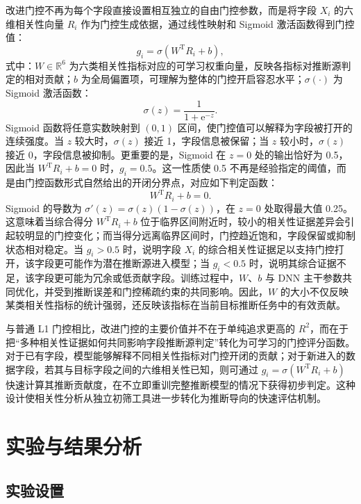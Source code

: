 \documentclass[UTF8,zihao=5,twoside]{ctexart}
\numberwithin{equation}{section}
\begin{document}
改进门控不再为每个字段直接设置相互独立的自由门控参数，而是将字段 $X_i$ 的六维相关性向量 $R_i$ 作为门控生成依据，通过线性映射和 Sigmoid 激活函数得到门控值：
\begin{equation}
g_i=\sigma(W^{\mathrm{T}}R_i+b),
\end{equation}
式中：$W\in\mathbb{R}^{6}$ 为六类相关性指标对应的可学习权重向量，反映各指标对推断源判定的相对贡献；$b$ 为全局偏置项，可理解为整体的门控开启容忍水平；$\sigma(\cdot)$ 为 Sigmoid 激活函数：
\begin{equation}
\sigma(z)=\frac{1}{1+\mathrm{e}^{-z}}.
\end{equation}
Sigmoid 函数将任意实数映射到 $(0,1)$ 区间，使门控值可以解释为字段被打开的连续强度。当 $z$ 较大时，$\sigma(z)$ 接近 1，字段信息被保留；当 $z$ 较小时，$\sigma(z)$ 接近 0，字段信息被抑制。更重要的是，Sigmoid 在 $z=0$ 处的输出恰好为 0.5，因此当 $W^{\mathrm{T}}R_i+b=0$ 时，$g_i=0.5$。这一性质使 0.5 不再是经验指定的阈值，而是由门控函数形式自然给出的开闭分界点，对应如下判定函数：
\begin{equation}
W^{\mathrm{T}}R_i+b=0.
\end{equation}
Sigmoid 的导数为 $\sigma'(z)=\sigma(z)(1-\sigma(z))$，在 $z=0$ 处取得最大值 0.25。这意味着当综合得分 $W^{\mathrm{T}}R_i+b$ 位于临界区间附近时，较小的相关性证据差异会引起较明显的门控变化；而当得分远离临界区间时，门控趋近饱和，字段保留或抑制状态相对稳定。当 $g_i>0.5$ 时，说明字段 $X_i$ 的综合相关性证据足以支持门控打开，该字段更可能作为潜在推断源进入模型；当 $g_i<0.5$ 时，说明其综合证据不足，该字段更可能为冗余或低贡献字段。训练过程中，$W$、$b$ 与 DNN 主干参数共同优化，并受到推断误差和门控稀疏约束的共同影响。因此，$W$ 的大小不仅反映某类相关性指标的统计强弱，还反映该指标在当前目标推断任务中的有效贡献。

与普通 L1 门控相比，改进门控的主要价值并不在于单纯追求更高的 $R^2$，而在于把“多种相关性证据如何共同影响字段推断源判定”转化为可学习的门控评分函数。对于已有字段，模型能够解释不同相关性指标对门控开闭的贡献；对于新进入的数据字段，若其与目标字段之间的六维相关性已知，则可通过 $g_i=\sigma(W^{\mathrm{T}}R_i+b)$ 快速计算其推断贡献度，在不立即重训完整推断模型的情况下获得初步判定。这种设计使相关性分析从独立初筛工具进一步转化为推断导向的快速评估机制。

\section{实验与结果分析}
\subsection{实验设置}
\end{document}
